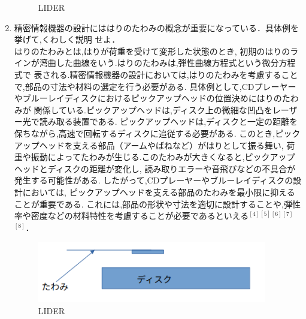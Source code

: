 \documentclass[a4paper,11pt]{jsarticle}
\begin{document}
\begin{enumerate}
\begin{figure}[h]
  \centering
  \caption{LIDER}
\end{figure}
\clearpage
\item 精密情報機器の設計にははりのたわみの概念が重要になっている．具体例を挙げて,くわしく説明
せよ．\\
\quad はりのたわみとは,はりが荷重を受けて変形した状態のとき,
初期のはりのラインが湾曲した曲線をいう.はりのたわみは,弾性曲線方程式という微分方程式で
表される.精密情報機器の設計においては,はりのたわみを考慮することで,部品の寸法や材料の選定を行う必要がある.
具体例として,CDプレーヤーやブルーレイディスクにおけるピックアップヘッドの位置決めにはりのたわみが
関係している.ピックアップヘッドは,ディスク上の微細な凹凸をレーザー光で読み取る装置である.
ピックアップヘッドは,ディスクと一定の距離を保ちながら,高速で回転するディスクに追従する必要がある.
このとき,ピックアップヘッドを支える部品（アームやばねなど）がはりとして振る舞い,
荷重や振動によってたわみが生じる.このたわみが大きくなると,ピックアップヘッドとディスクの距離が変化し,
読み取りエラーや音飛びなどの不具合が発生する可能性がある.
したがって,CDプレーヤーやブルーレイディスクの設計においては,
ピックアップヘッドを支える部品のたわみを最小限に抑えることが重要である.
これには,部品の形状や寸法を適切に設計することや,弾性率や密度などの材料特性を考慮することが必要であるといえる$^{[4]}$$^{[5]}$$^{[6]}$$^{[7]}$$^{[8]}$．
\begin{figure}[h]
  \centering
  \includegraphics[width=10cm]{8.png}
  \caption{LIDER}
\end{figure}

\end{enumerate}
\end{document}
